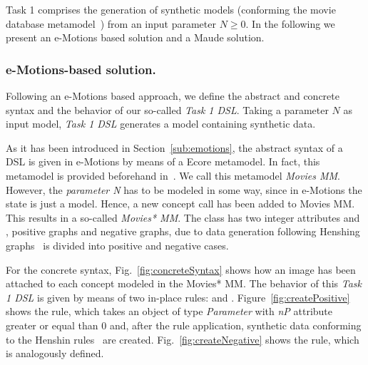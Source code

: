 
Task 1 comprises the generation of synthetic models (conforming the movie database metamodel~\cite{imdbcase}) from an input parameter $N \geq 0$. In the following we present an e-Motions based solution and a Maude solution. 


\subsubsection{e-Motions-based solution.}

Following an e-Motions based approach, we define the abstract and concrete syntax and the behavior of our so-called \textit{Task 1 DSL}. Taking a parameter $N$ as input model, \textit{Task 1 DSL} generates a model containing synthetic data.

As it has been introduced in Section~\ref{sub:emotions}, the abstract syntax of a DSL is given in e-Motions by means of a Ecore metamodel. In fact, this metamodel is provided beforehand in~\cite{imdbsources}. We call this metamodel \textit{Movies MM}. However, the \textit{parameter N} has to be modeled in some way, since in e-Motions the state is just a model. Hence, a new concept call  has been added to Movies MM. This results in a so-called \textit{Movies* MM}. The class  has two integer attributes  and , positive graphs and negative graphs, due to data generation following Henshing graphs~\cite{henshing} is divided into positive and negative cases.

For the concrete syntax, Fig.~\ref{fig:concreteSyntax} shows how an image has been attached to each concept modeled in the Movies* MM. The behavior of this \textit{Task 1 DSL} is given by means of two in-place rules:  and . Figure~\ref{fig:createPositive} shows the  rule, which takes an object  of type \textit{Parameter} with \textit{nP} attribute greater or equal than $0$ and, after the rule application, synthetic data conforming to the Henshin rules~\cite{henshing} are created. Fig.~\ref{fig:createNegative} shows the  rule, which is analogously defined.

